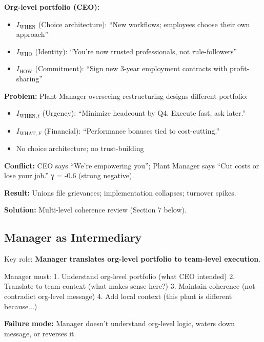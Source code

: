 \textbf{Org-level portfolio (CEO):}
\begin{itemize}[nosep]
\item $I_{\text{WHEN}}$ (Choice architecture): ``New workflows; employees choose their own approach''
\item $I_{\text{WHO}}$ (Identity): ``You're now trusted professionals, not rule-followers''
\item $I_{\text{HOW}}$ (Commitment): ``Sign new 3-year employment contracts with profit-sharing''
\end{itemize}

\textbf{Problem:} Plant Manager overseeing restructuring designs different portfolio:
\begin{itemize}[nosep]
\item $I_{\text{WHEN},t}$ (Urgency): ``Minimize headcount by Q4. Execute fast, ask later.''
\item $I_{\text{WHAT},F}$ (Financial): ``Performance bonuses tied to cost-cutting.''
\item No choice architecture; no trust-building
\end{itemize}

\textbf{Conflict:} CEO says ``We're empowering you''; Plant Manager says ``Cut costs or lose your job.'' γ = -0.6 (strong negative).

\textbf{Result:} Unions file grievances; implementation collapses; turnover spikes.

\textbf{Solution:} Multi-level coherence review (Section 7 below).

\subsection{Manager as Intermediary}

Key role: \textbf{Manager translates org-level portfolio to team-level execution}.

Manager must:
1. Understand org-level portfolio (what CEO intended)
2. Translate to team context (what makes sense here?)
3. Maintain coherence (not contradict org-level message)
4. Add local context (this plant is different because...)

\textbf{Failure mode:} Manager doesn't understand org-level logic, waters down message, or reverses it.


